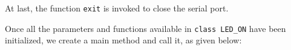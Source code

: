 \begin{enumerate}
    
    At last, the function {\tt exit} is invoked to close the serial port. 
      
      Once all the parameters and functions available in {\tt class LED\_ON} have been 
      initialized, we create a main method and call it, as given below: 
      



\end{enumerate}
